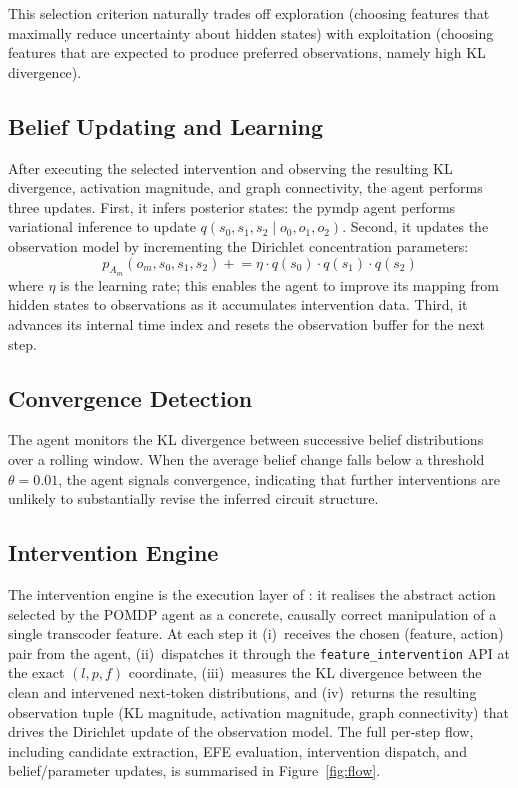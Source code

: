 This selection criterion naturally trades off exploration (choosing
features that maximally reduce uncertainty about hidden states) with
exploitation (choosing features that are expected to produce preferred
observations, namely high KL divergence).


\subsection{Belief Updating and Learning}

After executing the selected intervention and observing the resulting
KL divergence, activation magnitude, and graph connectivity, the agent
performs three updates.  First, it infers posterior states: the pymdp
agent performs variational inference to update
$q(s_0, s_1, s_2 \mid o_0, o_1, o_2)$.  Second, it updates the
observation model by incrementing the Dirichlet concentration
parameters:
\begin{equation}
  p_{A_m}(o_m, s_0, s_1, s_2) \mathrel{+}= \eta \cdot q(s_0) \cdot q(s_1) \cdot q(s_2)
\end{equation}
where $\eta$ is the learning rate; this enables the agent to improve
its mapping from hidden states to observations as it accumulates
intervention data.  Third, it advances its internal time index and
resets the observation buffer for the next step.


\subsection{Convergence Detection}

The agent monitors the KL divergence between successive belief
distributions over a rolling window. When the average belief change
falls below a threshold $\theta = 0.01$, the agent signals convergence,
indicating that further interventions are unlikely to substantially
revise the inferred circuit structure.


\subsection{Intervention Engine}
\label{sec:intervention_engine}

The intervention engine is the execution layer of \ACD{}: it realises
the abstract action selected by the POMDP agent as a concrete,
causally correct manipulation of a single transcoder feature.  At each
step it (i)~receives the chosen (feature, action) pair from the
agent, (ii)~dispatches it through the \texttt{feature\_intervention}
API at the exact $(l, p, f)$ coordinate, (iii)~measures the KL
divergence between the clean and intervened next-token distributions,
and (iv)~returns the resulting observation tuple (KL magnitude,
activation magnitude, graph connectivity) that drives the Dirichlet
update of the observation model.  The full per-step flow, including
candidate extraction, EFE evaluation, intervention dispatch, and
belief/parameter updates, is summarised in Figure~\ref{fig:flow}.

